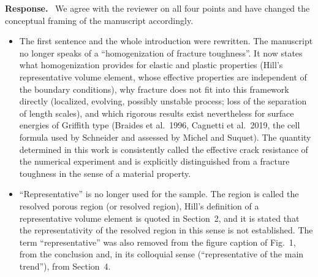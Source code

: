 \documentclass[pdflatex,sn-mathphys-num]{sn-jnl}
\newenvironment{response}
  {\par\noindent\textbf{Response.}\ }
  {\par}
\begin{document}
\begin{response}
We agree with the reviewer on all four points and have changed the conceptual framing of the manuscript accordingly.
\begin{itemize}
\item The first sentence and the whole introduction were rewritten. The manuscript no longer speaks of a ``homogenization of fracture toughness''. It now states what homogenization provides for elastic and plastic properties (Hill's representative volume element, whose effective properties are independent of the boundary conditions), why fracture does not fit into this framework directly (localized, evolving, possibly unstable process; loss of the separation of length scales), and which rigorous results exist nevertheless for surface energies of Griffith type (Braides et al.\ 1996, Cagnetti et al.\ 2019, the cell formula used by Schneider and assessed by Michel and Suquet). The quantity determined in this work is consistently called the effective crack resistance of the numerical experiment and is explicitly distinguished from a fracture toughness in the sense of a material property.
\item ``Representative'' is no longer used for the sample. The region is called the resolved porous region (or resolved region), Hill's definition of a representative volume element is quoted in Section~2, and it is stated that the representativity of the resolved region in this sense is not established. The term ``representative'' was also removed from the figure caption of Fig.~1, from the conclusion and, in its colloquial sense (``representative of the main trend''), from Section~4.

\end{itemize}
\end{response}
\end{document}
